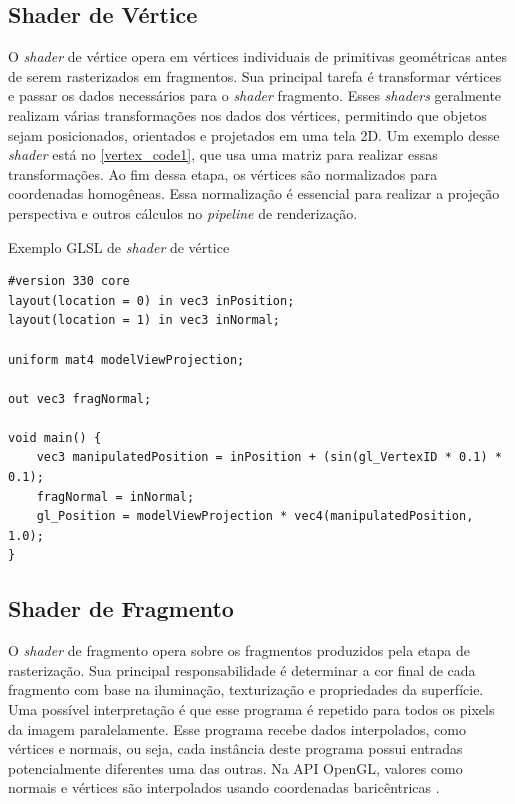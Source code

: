 \documentclass[english, 
               brazil, 
               bsc] %
               {dcomp-abntex2}
\begin{document}
\subsection{Shader de Vértice}

O \textit{shader} de vértice opera em vértices individuais de primitivas geométricas antes de serem rasterizados em fragmentos. Sua principal tarefa é transformar vértices e passar os dados necessários para o \textit{shader} fragmento. Esses \textit{shaders} geralmente realizam várias transformações nos dados dos vértices, permitindo que objetos sejam posicionados, orientados e projetados em uma tela 2D. Um exemplo desse \textit{shader} está no \autoref{vertex_code1}, que usa uma matriz para realizar essas transformações. Ao fim dessa etapa, os vértices são normalizados para coordenadas homogêneas. Essa normalização é essencial para realizar a projeção perspectiva e outros cálculos no \textit{pipeline} de renderização.


\begin{codigo}[H]
  \caption{Exemplo GLSL de \textit{shader} de vértice}
 \label{vertex_code1}
\begin{lstlisting}
#version 330 core
layout(location = 0) in vec3 inPosition;
layout(location = 1) in vec3 inNormal;

uniform mat4 modelViewProjection;

out vec3 fragNormal;

void main() {
    vec3 manipulatedPosition = inPosition + (sin(gl_VertexID * 0.1) * 0.1);
    fragNormal = inNormal;
    gl_Position = modelViewProjection * vec4(manipulatedPosition, 1.0);
}
\end{lstlisting}
\end{codigo}

\subsection{Shader de Fragmento}

O \textit{shader} de fragmento opera sobre os fragmentos produzidos pela etapa de rasterização. Sua principal responsabilidade é determinar a cor final de cada fragmento com base na iluminação, texturização e propriedades da superfície. Uma possível interpretação é que esse programa é repetido para todos os pixels da imagem paralelamente.  Esse programa recebe dados interpolados, como vértices e normais, ou seja, cada instância deste programa possui entradas potencialmente diferentes uma das outras. Na API OpenGL, valores como normais e vértices são interpolados usando coordenadas baricêntricas \cite{opengl_interpolation}.
\end{document}
